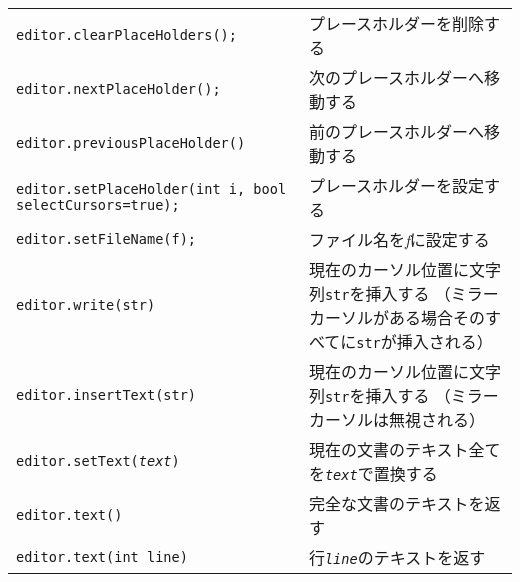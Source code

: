 \begin{longtable}{XX}
  \texttt{editor.clearPlaceHolders();} & プレースホルダーを削除する\\
  \texttt{editor.nextPlaceHolder();} & 次のプレースホルダーへ移動する\\
  \texttt{editor.previousPlaceHolder()} & 前のプレースホルダーへ移動する\\
  \texttt{editor.setPlaceHolder(int i, bool selectCursors=true);}
    & プレースホルダーを設定する\\
  \texttt{editor.setFileName(f);} & ファイル名を\emph{f}に設定する\\
  \texttt{editor.write(str)}
    & 現在のカーソル位置に文字列\texttt{str}を挿入する
    （ミラーカーソルがある場合そのすべてに\texttt{str}が挿入される）\\
  \texttt{editor.insertText(str)}
    & 現在のカーソル位置に文字列\texttt{str}を挿入する
    （ミラーカーソルは無視される）\\
  \texttt{editor.setText(\emph{text})}
    & 現在の文書のテキスト全てを\texttt{\emph{text}}で置換する\\
  \texttt{editor.text()} & 完全な文書のテキストを返す\\
  \texttt{editor.text(int line)} & 行\texttt{\emph{line}}のテキストを返す\\
  \hline
\end{longtable}
